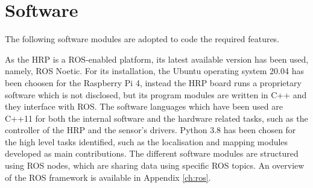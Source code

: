 \section{Software}
\label{sec:soft-system}
\noindent The following software modules are adopted to code the required features.

As the \gls{HRP} is a \gls{ROS}-enabled platform, its latest available version has been used, namely, ROS Noetic.
For its installation, the Ubuntu operating system 20.04 has been choosen for the Raspberry Pi 4, instead the \gls{HRP} board runs a proprietary software which is not disclosed, but its program modules are written in C++ and they interface with ROS.
The software languages which have been used are C++11 for both the internal software and the hardware related tasks, such as the controller of the \gls{HRP} and the sensor's drivers.
Python 3.8 has been chosen for the high level tasks identified, such as the localisation and mapping modules developed as main contributions.
The different software modules are structured using \gls{ROS} nodes, which are sharing data using specific \gls{ROS} topics. An overview of the \gls{ROS} framework is available in Appendix \ref{ch:ros}. 

\cleardoublepage